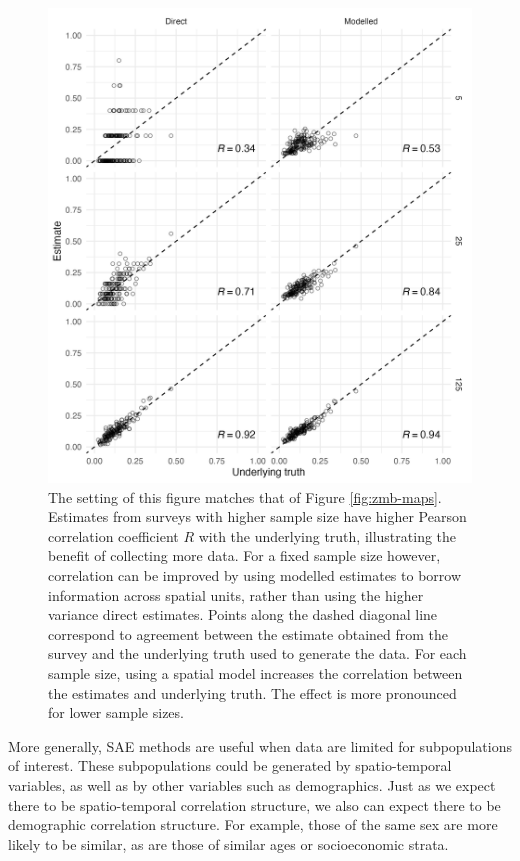 \documentclass[a4paper, nobind]{templates/ociamthesis}
\begin{document}
\begin{figure}
\includegraphics[width=0.95\linewidth]{figures/bayesian/zmb-scatter} \caption{The setting of this figure matches that of Figure \ref{fig:zmb-maps}. Estimates from surveys with higher sample size have higher Pearson correlation coefficient \(R\) with the underlying truth, illustrating the benefit of collecting more data. For a fixed sample size however, correlation can be improved by using modelled estimates to borrow information across spatial units, rather than using the higher variance direct estimates. Points along the dashed diagonal line correspond to agreement between the estimate obtained from the survey and the underlying truth used to generate the data. For each sample size, using a spatial model increases the correlation between the estimates and underlying truth. The effect is more pronounced for lower sample sizes.}\label{fig:zmb-scatter}
\end{figure}

More generally, SAE methods are useful when data are limited for subpopulations of interest.
These subpopulations could be generated by spatio-temporal variables, as well as by other variables such as demographics.
Just as we expect there to be spatio-temporal correlation structure, we also can expect there to be demographic correlation structure.
For example, those of the same sex are more likely to be similar, as are those of similar ages or socioeconomic strata.
\end{document}
